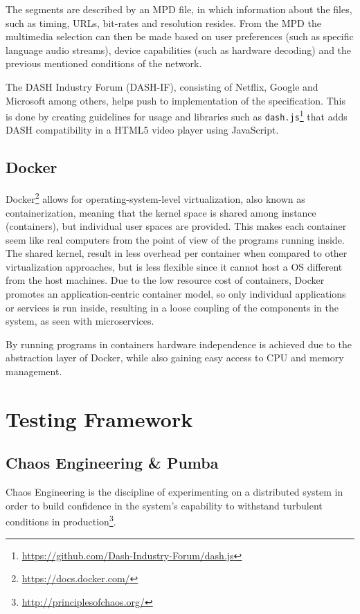 The segments are described by an \ac{MPD} file, in which information about the files, such as timing, \ac{URL}s, bit-rates and resolution resides. From the \ac{MPD} the multimedia selection can then be made based on user preferences (such as specific language audio streams), device capabilities (such as hardware decoding) and the previous mentioned conditions of the network.

The \ac{DASH} Industry Forum (DASH-IF), consisting of Netflix, Google and Microsoft among others, helps push to implementation of the specification\cite{ISO23009}. This is done by creating guidelines for usage and libraries such as \texttt{dash.js}\footnote{\url{https://github.com/Dash-Industry-Forum/dash.js}} that adds \ac{DASH} compatibility in a \ac{HTML}5 video player using JavaScript.

\subsection{Docker}
Docker\footnote{\url{https://docs.docker.com/}} allows for operating-system-level virtualization, also known as containerization, meaning that the kernel space is shared among instance (containers), but individual user spaces are provided. This makes each container seem like real computers from the point of view of the programs running inside. 
The shared kernel, result in less overhead per container when compared to other virtualization approaches, but is less flexible since it cannot host a \ac{OS} different from the host machines. Due to the low resource cost of containers, Docker promotes an application-centric container model\cite{merkel2014docker}, so only individual applications or services is run inside, resulting in a loose coupling of the components in the system, as seen with microservices. 

By running programs in containers hardware independence is achieved due to the abstraction layer of Docker, while also gaining easy access to CPU and memory management.

\section{Testing Framework}
\subsection{Chaos Engineering \& Pumba}
\label{sec:framework_pumba}
Chaos Engineering is the discipline of experimenting on a distributed system in order to build confidence in the system’s capability to withstand turbulent conditions in production\footnote{\url{http://principlesofchaos.org/}}.

